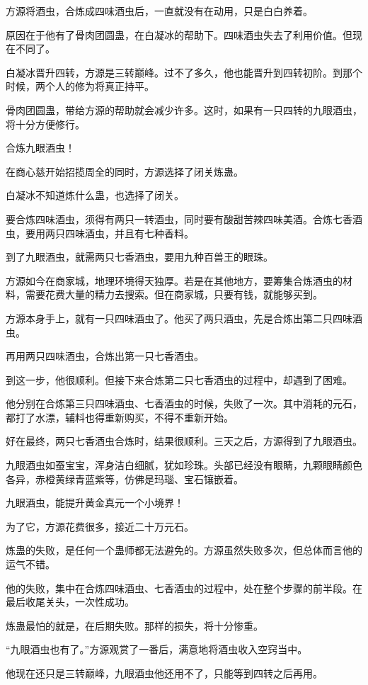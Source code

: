 \begin{this_body}
方源将酒虫，合炼成四味酒虫后，一直就没有在动用，只是白白养着。

原因在于他有了骨肉团圆蛊，在白凝冰的帮助下。四味酒虫失去了利用价值。但现在不同了。

白凝冰晋升四转，方源是三转巅峰。过不了多久，他也能晋升到四转初阶。到那个时候，两个人的修为将真正持平。

骨肉团圆蛊，带给方源的帮助就会减少许多。这时，如果有一只四转的九眼酒虫，将十分方便修行。

合炼九眼酒虫！

在商心慈开始招揽周全的同时，方源选择了闭关炼蛊。

白凝冰不知道炼什么蛊，也选择了闭关。

要合炼四味酒虫，须得有两只一转酒虫，同时要有酸甜苦辣四味美酒。合炼七香酒虫，要用两只四味酒虫，并且有七种香料。

到了九眼酒虫，就需两只七香酒虫，要用九种百兽王的眼珠。

方源如今在商家城，地理环境得天独厚。若是在其他地方，要筹集合炼酒虫的材料，需要花费大量的精力去搜索。但在商家城，只要有钱，就能够买到。

方源本身手上，就有一只四味酒虫了。他买了两只酒虫，先是合炼出第二只四味酒虫。

再用两只四味酒虫，合炼出第一只七香酒虫。

到这一步，他很顺利。但接下来合炼第二只七香酒虫的过程中，却遇到了困难。

他分别在合炼第三只四味酒虫、七香酒虫的时候，失败了一次。其中消耗的元石，都打了水漂，辅料也得重新购买，不得不重新开始。

好在最终，两只七香酒虫合炼时，结果很顺利。三天之后，方源得到了九眼酒虫。

九眼酒虫如蚕宝宝，浑身洁白细腻，犹如珍珠。头部已经没有眼睛，九颗眼睛颜色各异，赤橙黄绿青蓝紫等，仿佛是玛瑙、宝石镶嵌着。

九眼酒虫，能提升黄金真元一个小境界！

为了它，方源花费很多，接近二十万元石。

炼蛊的失败，是任何一个蛊师都无法避免的。方源虽然失败多次，但总体而言他的运气不错。

他的失败，集中在合炼四味酒虫、七香酒虫的过程中，处在整个步骤的前半段。在最后收尾关头，一次性成功。

炼蛊最怕的就是，在后期失败。那样的损失，将十分惨重。

“九眼酒虫也有了。”方源观赏了一番后，满意地将酒虫收入空窍当中。

他现在还只是三转巅峰，九眼酒虫他还用不了，只能等到四转之后再用。


\end{this_body}
